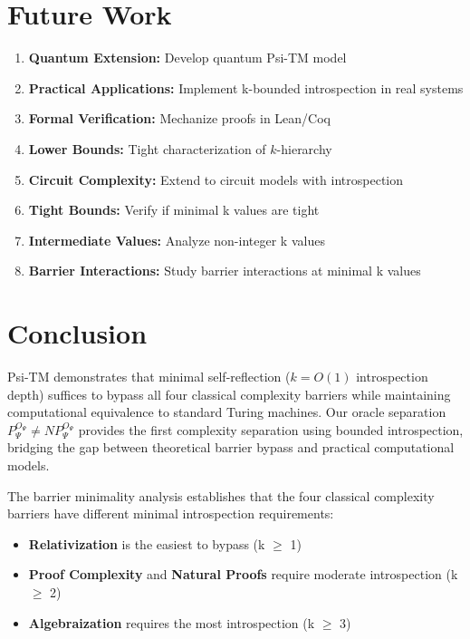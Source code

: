 \documentclass[11pt]{article}
\begin{document}
\section{Future Work}

\begin{enumerate}
\item \textbf{Quantum Extension:} Develop quantum Psi-TM model
\item \textbf{Practical Applications:} Implement k-bounded introspection in real systems  
\item \textbf{Formal Verification:} Mechanize proofs in Lean/Coq
\item \textbf{Lower Bounds:} Tight characterization of $k$-hierarchy
\item \textbf{Circuit Complexity:} Extend to circuit models with introspection
\item \textbf{Tight Bounds:} Verify if minimal k values are tight
\item \textbf{Intermediate Values:} Analyze non-integer k values
\item \textbf{Barrier Interactions:} Study barrier interactions at minimal k values
\end{enumerate}

\section{Conclusion}

Psi-TM demonstrates that minimal self-reflection ($k = O(1)$ introspection depth) suffices to bypass all four classical complexity barriers while maintaining computational equivalence to standard Turing machines. Our oracle separation $P^{O_\Psi}_\Psi \neq NP^{O_\Psi}_\Psi$ provides the first complexity separation using bounded introspection, bridging the gap between theoretical barrier bypass and practical computational models.

The barrier minimality analysis establishes that the four classical complexity barriers have different minimal introspection requirements:
\begin{itemize}
\item \textbf{Relativization} is the easiest to bypass (k $\geq$ 1)
\item \textbf{Proof Complexity} and \textbf{Natural Proofs} require moderate introspection (k $\geq$ 2)
\item \textbf{Algebraization} requires the most introspection (k $\geq$ 3)
\end{itemize}
\end{document}
